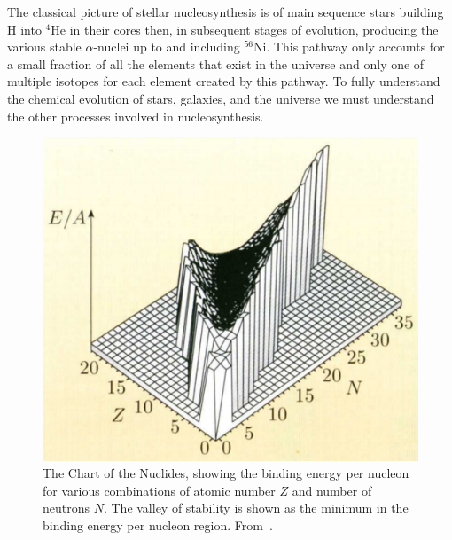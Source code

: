 \label{sec:nuc}

The classical picture of stellar nucleosynthesis is of main
sequence stars
building H into $^4$He in their cores then, in subsequent stages of
evolution, producing the various stable $\alpha$-nuclei up to 
and including $^{56}$Ni. This pathway only accounts for a small fraction of all the elements
that exist in the universe and only one of multiple isotopes for each
element created by this pathway.  To fully
understand the chemical evolution of stars, galaxies, and the universe
we must understand the other processes involved in nucleosynthesis.

\begin{figure}
\includegraphics[width=\linewidth]{pdf/con.png}
\caption{\label{fig:con} The Chart of the Nuclides, showing the
  binding energy per nucleon for various combinations of atomic number
  $Z$ and number of neutrons $N$.  The valley of stability is shown as
  the minimum in the binding energy per nucleon region. From~\cite{ryan2010}.}
\end{figure}

